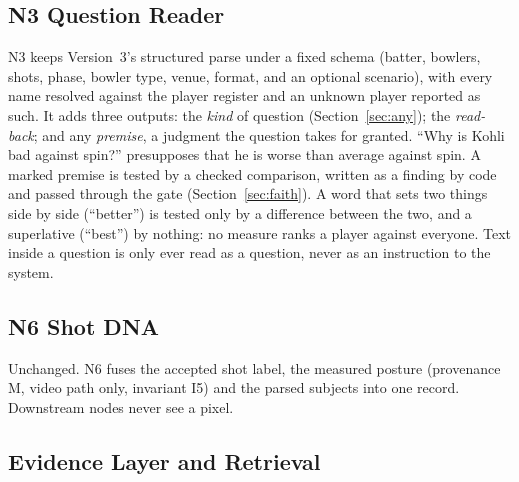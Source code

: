 \documentclass[11pt,a4paper]{article}
\begin{document}
\subsection{N3 Question Reader}

N3 keeps Version~3's structured parse under a fixed schema (batter, bowlers,
shots, phase, bowler type, venue, format, and an optional scenario), with every
name resolved against the player register and an unknown player reported as
such. It adds three outputs: the \emph{kind} of question (Section~\ref{sec:any});
the \emph{read-back}; and any \emph{premise}, a judgment the question takes for
granted. ``Why is Kohli bad against spin?'' presupposes that he is worse than
average against spin. A marked premise is tested by a checked comparison, written
as a finding by code and passed through the gate (Section~\ref{sec:faith}). A word
that sets two things side by side (``better'') is tested only by a difference
between the two, and a superlative (``best'') by nothing: no measure ranks a player
against everyone. Text inside a question is only ever
read as a question, never as an instruction to the system.

\subsection{N6 Shot DNA}

Unchanged. N6 fuses the accepted shot label, the measured posture (provenance M,
video path only, invariant I5) and the parsed subjects into one record.
Downstream nodes never see a pixel.

\subsection{Evidence Layer and Retrieval}
\end{document}
